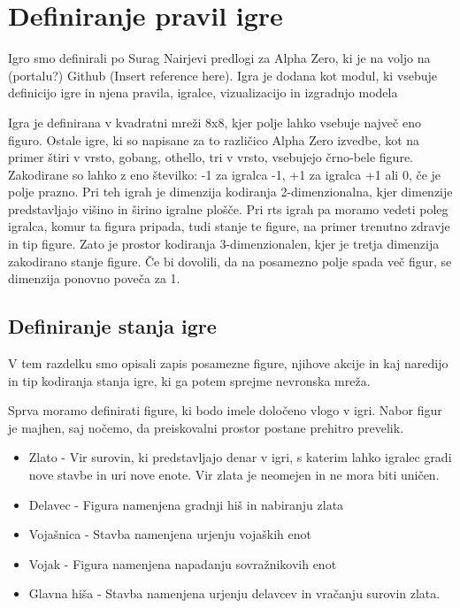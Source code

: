 \documentclass[a4paper, 12pt]{book}
\begin{document}
\chapter{Definiranje pravil igre}
\label{chpravilaigre}

Igro smo definirali po Surag Nairjevi predlogi za Alpha Zero, ki je na voljo na (portalu?) Github (Insert reference here).
Igra je dodana kot modul, ki vsebuje definicijo igre in njena pravila, igralce, vizualizacijo in izgradnjo modela

Igra je definirana v kvadratni mreži 8x8, kjer polje lahko vsebuje največ eno figuro.
Ostale igre, ki so napisane za to različico Alpha Zero izvedbe, kot na primer štiri v vrsto, gobang, othello, tri v vrsto, vsebujejo črno-bele figure.
Zakodirane so lahko z eno številko: -1 za igralca -1, +1 za igralca +1 ali 0, če je polje prazno.
Pri teh igrah je dimenzija kodiranja 2-dimenzionalna, kjer dimenzije predstavljajo višino in širino igralne plošče.
Pri rts igrah pa moramo vedeti poleg igralca, komur ta figura pripada, tudi stanje te figure, na primer trenutno zdravje in tip figure.
Zato je prostor kodiranja 3-dimenzionalen, kjer je tretja dimenzija zakodirano stanje figure.
Če bi dovolili, da na posamezno polje spada več figur, se dimenzija ponovno poveča za 1.

\section{Definiranje stanja igre}
V tem razdelku smo opisali zapis posamezne figure, njihove akcije in kaj naredijo in tip kodiranja stanja igre, ki ga potem sprejme nevronska mreža.

Sprva moramo definirati figure, ki bodo imele določeno vlogo v igri. Nabor figur je majhen, saj nočemo, da preiskovalni prostor postane prehitro prevelik.
\begin{itemize}
	\item Zlato - Vir surovin, ki predstavljajo denar v igri, s katerim lahko igralec gradi nove stavbe in uri nove enote. Vir zlata je neomejen in ne mora biti uničen.
	\item Delavec - Figura namenjena gradnji hiš in nabiranju zlata
	\item Vojašnica - Stavba namenjena urjenju vojaških enot
	\item Vojak - Figura namenjena napadanju sovražnikovih enot
	\item Glavna hiša - Stavba namenjena urjenju delavcev in vračanju surovin zlata.
\end{itemize}
\end{document}
